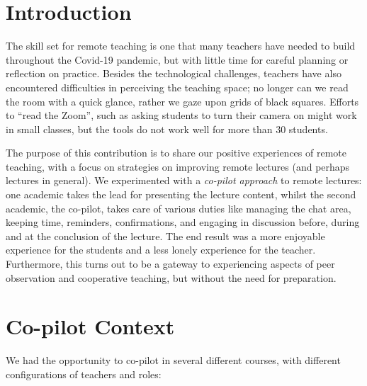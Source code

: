 \documentclass[sigconf,natbib=false]{acmart}
\begin{document}


\maketitle

\section{Introduction}

The skill set for remote teaching is one that many teachers have needed to  build throughout the Covid-19 pandemic, but with little time for careful planning or reflection on practice. Besides the technological challenges, teachers have also encountered difficulties in perceiving the teaching space; no longer can we read the room with a quick glance, rather we gaze upon grids of black squares.
Efforts to \enquote{read the Zoom}, such as asking students to turn their 
camera on might work in small classes, but the tools do not work well for more 
than 30 students.

The purpose of this contribution is to share our positive experiences of remote 
teaching, with a focus on strategies on improving remote lectures (and perhaps 
lectures in general). We experimented with a \emph{co-pilot approach} to remote 
lectures: one academic takes the lead for presenting the lecture content, 
whilst the second academic, the co-pilot, takes care of various duties like 
managing the chat area, keeping time, reminders, confirmations, and engaging in 
discussion before, during and at the conclusion of the lecture. The end result 
was a more enjoyable experience for the students and a less lonely experience 
for the teacher. Furthermore, this turns out to be a gateway to experiencing 
aspects of peer observation and cooperative teaching, but without the need for 
preparation.

\section{Co-pilot Context}
We had the opportunity to co-pilot in several different courses, with different 
configurations of teachers and roles:
\end{document}
